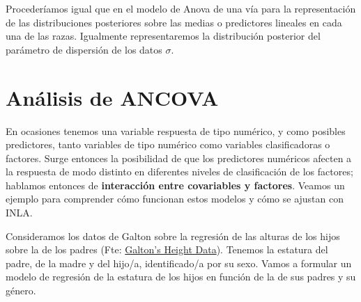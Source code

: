 \documentclass[
]{book}
\begin{document}
Procederíamos igual que en el modelo de Anova de una vía para la representación de las distribuciones posteriores sobre las medias o predictores lineales en cada una de las razas. Igualmente representaremos la distribución posterior del parámetro de dispersión de los datos \(\sigma\).

\hypertarget{anuxe1lisis-de-ancova}{%
\section{Análisis de ANCOVA}\label{anuxe1lisis-de-ancova}}

En ocasiones tenemos una variable respuesta de tipo numérico, y como posibles predictores, tanto variables de tipo numérico como variables clasificadoras o factores. Surge entonces la posibilidad de que los predictores numéricos afecten a la respuesta de modo distinto en diferentes niveles de clasificación de los factores; hablamos entonces de \textbf{interacción entre covariables y factores}. Veamos un ejemplo para comprender cómo funcionan estos modelos y cómo se ajustan con INLA.

Consideramos los datos de Galton sobre la regresión de las alturas de los hijos sobre la de los padres (Fte: \href{http://www.randomservices.org/random/}{Galton's Height Data}). Tenemos la estatura del padre, de la madre y del hijo/a, identificado/a por su sexo.
Vamos a formular un modelo de regresión de la estatura de los hijos en función de la de sus padres y su género.
\end{document}
